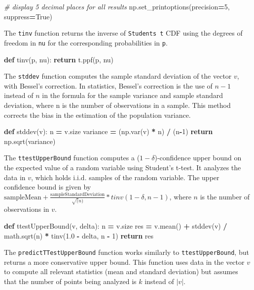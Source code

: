 \documentclass[12pt, twoside]{amherstthesis}
\newenvironment{Shaded}{\begin{snugshade}}{\end{snugshade}}
\newcommand{\CommentTok}[1]{\textcolor[rgb]{0.56,0.35,0.01}{\textit{#1}}}
\newcommand{\ControlFlowTok}[1]{\textcolor[rgb]{0.13,0.29,0.53}{\textbf{#1}}}
\newcommand{\DecValTok}[1]{\textcolor[rgb]{0.00,0.00,0.81}{#1}}
\newcommand{\FloatTok}[1]{\textcolor[rgb]{0.00,0.00,0.81}{#1}}
\newcommand{\KeywordTok}[1]{\textcolor[rgb]{0.13,0.29,0.53}{\textbf{#1}}}
\newcommand{\NormalTok}[1]{#1}
\newcommand{\OperatorTok}[1]{\textcolor[rgb]{0.81,0.36,0.00}{\textbf{#1}}}
\newcommand{\VariableTok}[1]{\textcolor[rgb]{0.00,0.00,0.00}{#1}}
\begin{document}
\begin{Shaded}
\begin{Highlighting}[]
\CommentTok{\# display 5 decimal places for all results}
\NormalTok{np.set\_printoptions(precision}\OperatorTok{=}\DecValTok{5}\NormalTok{, suppress}\OperatorTok{=}\VariableTok{True}\NormalTok{)}
\end{Highlighting}
\end{Shaded}
\noindent The \texttt{tinv} function returns the inverse of \texttt{Student\textquotesingle{}s\ t} CDF using the degrees of freedom in \texttt{nu} for the corresponding probabilities in \texttt{p}.
\begin{Shaded}
\begin{Highlighting}[]
\KeywordTok{def}\NormalTok{ tinv(p, nu):}
    \ControlFlowTok{return}\NormalTok{ t.ppf(p, nu)}
\end{Highlighting}
\end{Shaded}
\noindent The \texttt{stddev} function computes the sample standard deviation of the vector \(v\), with Bessel's correction. In statistics, Bessel's correction is the use of \(n-1\) instead of \(n\) in the formula for the sample variance and sample standard deviation, where n is the number of observations in a sample. This method corrects the bias in the estimation of the population variance.
\begin{Shaded}
\begin{Highlighting}[]
\KeywordTok{def}\NormalTok{ stddev(v):}
\NormalTok{    n }\OperatorTok{=}\NormalTok{ v.size}
\NormalTok{    variance }\OperatorTok{=}\NormalTok{ (np.var(v) }\OperatorTok{*}\NormalTok{ n) }\OperatorTok{/}\NormalTok{ (n}\OperatorTok{{-}}\DecValTok{1}\NormalTok{) }
    \ControlFlowTok{return}\NormalTok{ np.sqrt(variance) }
\end{Highlighting}
\end{Shaded}
\noindent The \texttt{ttestUpperBound} function computes a (\(1 - \delta\))-confidence upper bound on the expected value of a random variable using Student's t-test. It analyzes the data in \(v\), which holds i.i.d. samples of the random variable. The upper confidence bound is given by \(\text{sampleMean} + \frac{\text{sampleStandardDeviation}}{\sqrt(n)} * tinv(1-\delta, n-1)\), where \(n\) is the number of observations in \(v\).
\begin{Shaded}
\begin{Highlighting}[]
\KeywordTok{def}\NormalTok{ ttestUpperBound(v, delta):}
\NormalTok{    n  }\OperatorTok{=}\NormalTok{ v.size}
\NormalTok{    res }\OperatorTok{=}\NormalTok{ v.mean() }\OperatorTok{+}\NormalTok{ stddev(v) }\OperatorTok{/}\NormalTok{ math.sqrt(n) }\OperatorTok{*}\NormalTok{ tinv(}\FloatTok{1.0} \OperatorTok{{-}}\NormalTok{ delta, n }\OperatorTok{{-}} \DecValTok{1}\NormalTok{)}
    \ControlFlowTok{return}\NormalTok{ res}
\end{Highlighting}
\end{Shaded}
\noindent The \texttt{predictTTestUpperBound} function works similarly to \texttt{ttestUpperBound}, but returns a more conservative upper bound. This function uses data in the vector \(v\) to compute all relevant statistics (mean and standard deviation) but assumes that the number of points being analyzed is \(k\) instead of \(|v|\).
\end{document}
